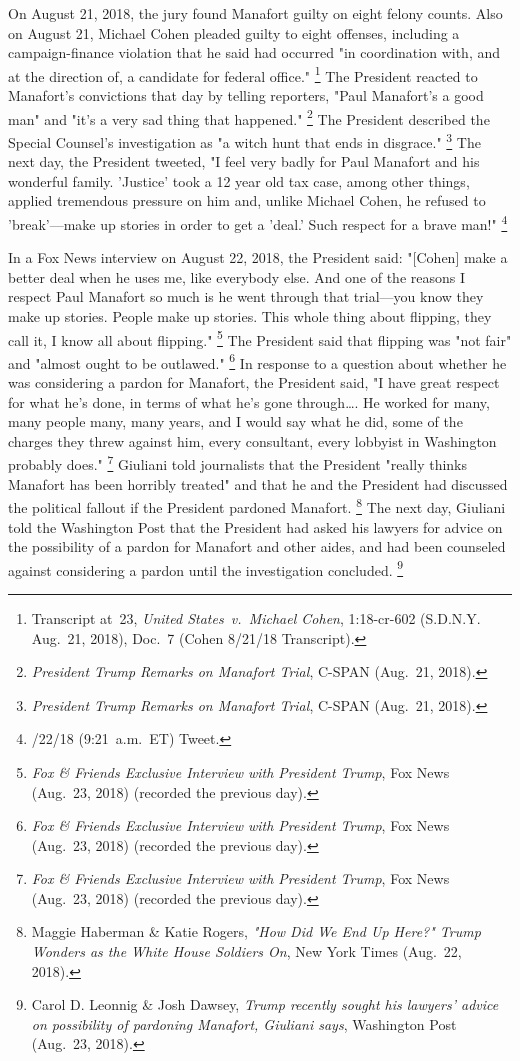 {On August 21, 2018, the jury found Manafort guilty on eight felony counts.
Also on August 21, Michael Cohen pleaded guilty to eight offenses, including a campaign-finance violation that he said had occurred "in coordination with, and at the direction of, a candidate for federal office."%
\footnote{Transcript at~23, \textit{United States~v.\ Michael Cohen}, 1:18-cr-602 (S.D.N.Y. Aug.~21, 2018), Doc.~7 (Cohen 8/21/18 Transcript).}
The President reacted to Manafort's convictions that day by telling reporters, "Paul Manafort's a good man" and "it's a very sad thing that happened."%
\footnote{\textit{President Trump Remarks on Manafort Trial}, C-SPAN (Aug.~21, 2018).}
The President described the Special Counsel's investigation as "a witch hunt that ends in disgrace."%
\footnote{\textit{President Trump Remarks on Manafort Trial}, C-SPAN (Aug.~21, 2018).}
The next day, the President tweeted, "I feel very badly for Paul Manafort and his wonderful family.
'Justice' took a 12 year old tax case, among other things, applied tremendous pressure on him and, unlike Michael Cohen, he refused to 'break'---make up stories in order to get a 'deal.'
Such respect for a brave man!"%
\footnote{/22/18 (9:21~a.m.~ET) Tweet.}

In a Fox News interview on August 22, 2018, the President said: "[Cohen] make a better deal when he uses me, like everybody else.
And one of the reasons I respect Paul Manafort so much is he went through that trial---you know they make up stories.
People make up stories.
This whole thing about flipping, they call it, I know all about flipping."%
\footnote{\textit{Fox \& Friends Exclusive Interview with President Trump}, Fox News (Aug.~23, 2018) (recorded the previous day).}
The President said that flipping was "not fair" and "almost ought to be outlawed."%
\footnote{\textit{Fox \& Friends Exclusive Interview with President Trump}, Fox News (Aug.~23, 2018) (recorded the previous day).}
In response to a question about whether he was considering a pardon for Manafort, the President said, "I have great respect for what he's done, in terms of what he's gone through\dots.
He worked for many, many people many, many years, and I would say what he did, some of the charges they threw against him, every consultant, every lobbyist in Washington probably does."%
\footnote{\textit{Fox \& Friends Exclusive Interview with President Trump}, Fox News (Aug.~23, 2018) (recorded the previous day).}
Giuliani told journalists that the President "really thinks Manafort has been horribly treated" and that he and the President had discussed the political fallout if the President pardoned Manafort.%
\footnote{Maggie Haberman \& Katie Rogers, \textit{"How Did We End Up Here?" Trump Wonders as the White House Soldiers On}, New York Times (Aug.~22, 2018).}
The next day, Giuliani told the Washington Post that the President had asked his lawyers for advice on the possibility of a pardon for Manafort and other aides, and had been counseled against considering a pardon until the investigation concluded.%
\footnote{Carol D. Leonnig \& Josh Dawsey, \textit{Trump recently sought his lawyers' advice on possibility of pardoning Manafort, Giuliani says}, Washington Post (Aug.~23, 2018).}

}
